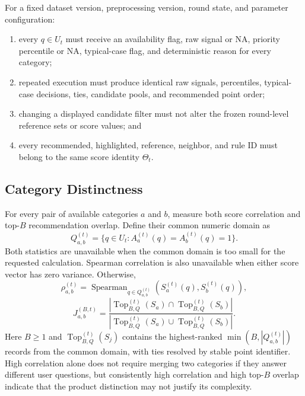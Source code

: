 \documentclass[11pt]{article}
\newcommand{\NA}{\mathrm{NA}}
\begin{document}
For a fixed dataset version, preprocessing version, round state, and parameter
configuration:
\begin{enumerate}[leftmargin=*]
    \item every $q\in U_t$ must receive an availability flag, raw signal or
    $\NA$, priority percentile or $\NA$, typical-case flag, and deterministic
    reason for every category;
    \item repeated execution must produce identical raw signals, percentiles,
    typical-case decisions, ties, candidate pools, and recommended point order;
    \item changing a displayed candidate filter must not alter the frozen
    round-level reference sets or score values; and
    \item every recommended, highlighted, reference, neighbor, and rule ID must
    belong to the same score identity $\Theta_t$.
\end{enumerate}

\subsection{Category Distinctness}

For every pair of available categories $a$ and $b$, measure both score
correlation and top-$B$ recommendation overlap. Define their common numeric
domain as
\begin{equation}
    Q_{a,b}^{(t)}
    =
    \{q\in U_t:A_a^{(t)}(q)=A_b^{(t)}(q)=1\}.
\end{equation}
Both statistics are unavailable when the common domain is too small for the
requested calculation. Spearman correlation is also unavailable when either
score vector has zero variance. Otherwise,
\begin{equation}
    \rho_{a,b}^{(t)}
    =
    \operatorname{Spearman}_{q\in Q_{a,b}^{(t)}}
    \!\left(S_a^{(t)}(q),S_b^{(t)}(q)\right),
\end{equation}
\begin{equation}
    J_{a,b}^{(B,t)}
    =
    \frac{
        |\operatorname{Top}_{B,Q}^{(t)}(S_a)
        \cap\operatorname{Top}_{B,Q}^{(t)}(S_b)|
    }{
        |\operatorname{Top}_{B,Q}^{(t)}(S_a)
        \cup\operatorname{Top}_{B,Q}^{(t)}(S_b)|
    }.
\end{equation}
Here $B\geq1$ and $\operatorname{Top}_{B,Q}^{(t)}(S_j)$ contains the highest-ranked
$\min(B,|Q_{a,b}^{(t)}|)$ records from the common domain, with ties resolved by
stable point identifier.
High correlation alone does not require merging two categories if they answer
different user questions, but consistently high correlation and high top-$B$
overlap indicate that the product distinction may not justify its complexity.
\end{document}
